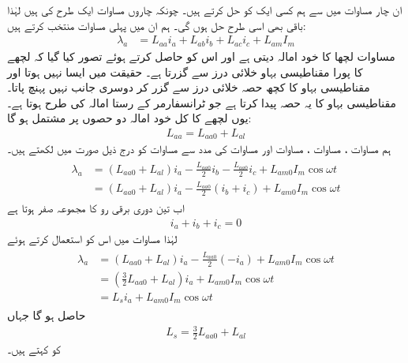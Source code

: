 ان چار مساوات میں سے ہم کسی ایک کو  حل کرتے ہیں۔ چونکہ چاروں مساوات ایک طرح کی ہیں لہٰذا  باقی بھی اسی طرح حل ہوں گی۔ ہم ان میں  پہلی  مساوات منتخب کرتے ہیں:
\begin{align}\label{مساوات_معاصر_ارتباط_الف_کل}
\lambda_a&=L_{aa} i_a+L_{ab} i_b +L_{ac} i_c+L_{am} I_m
\end{align}
 مساوات   لچھا    کا خود امالہ دیتی ہے اور اس کو حاصل کرتے ہوئے تصور کیا گیا کہ لچھے کا پورا مقناطیسی بہاو خلائی درز سے گزرتا ہے۔ حقیقت میں ایسا نہیں ہوتا اور مقناطیسی بہاو  کا کچھ حصہ خلائی درز  سے گزر کر دوسری جانب نہیں پہنچ پاتا۔  مقناطیسی بہاو کا یہ حصہ     پیدا کرتا ہے جو  ٹرانسفارمر کے رستا امالہ کی طرح ہوتا ہے۔ یوں لچھے کا کل خود امالہ   دو حصوں پر مشتمل ہو گا:
\begin{align}\label{مساوات_معاصر_الف_خود_کل_امالہ}
L_{aa}=L_{aa0}+L_{al}
\end{align}
ہم مساوات ،  مساوات ،  مساوات   اور مساوات   کی مدد سے مساوات   کو درج ذیل صورت میں لکھتے ہیں۔
\begin{gather}
\begin{aligned}\label{مساوات_معاصر_ارتباط_الف}
\lambda_a&=\left(L_{aa0}+L_{al} \right)i_a-\frac{L_{aa0}}{2} i_b -\frac{L_{aa0}}{2} i_c+L_{am0} I_m \cos \omega t \\
&=\left(L_{aa0}+L_{al} \right)i_a-\frac{L_{aa0}}{2} \left( i_b+i_c \right)+L_{am0} I_m \cos \omega t
\end{aligned}
\end{gather}
اب تین دوری برقی رو کا مجموعہ صفر ہوتا ہے 
\begin{align}
i_a+i_b+i_c=0
\end{align}
لہٰذا مساوات   میں اس کو استعمال کرتے ہوئے
\begin{gather}
\begin{aligned}
\lambda_a&=\left(L_{aa0}+L_{al} \right)i_a-\frac{L_{aa0}}{2} \left( -i_a \right)+L_{am0} I_m \cos \omega t\\
&=\left(\frac{3}{2} L_{aa0}+L_{al} \right)i_a+L_{am0} I_m \cos \omega t\\
&=L_s i_a+L_{am0} I_m \cos \omega t
\end{aligned}
\end{gather}
حاصل ہو گا جہاں
\begin{align}\label{مساوات_معاصر_معاصر_امالہ}
L_s=\frac{3}{2} L_{aa0}+L_{al}
\end{align}
کو  کہتے ہیں۔

